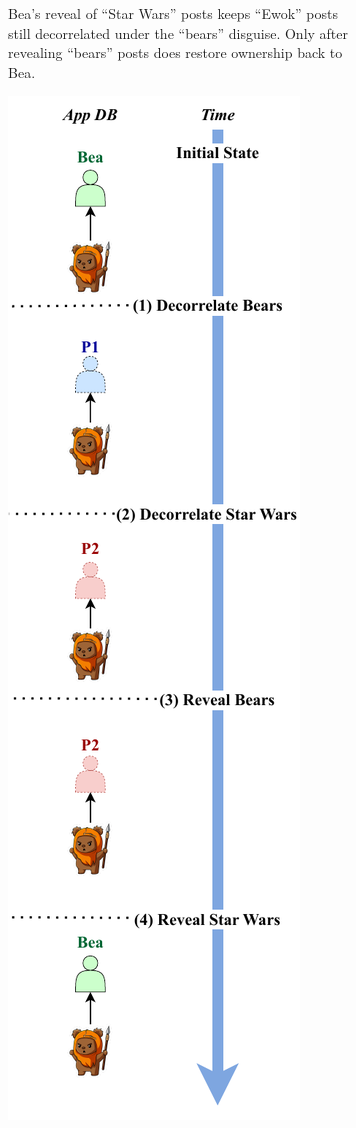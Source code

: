 \begin{figure}
\begin{subfigure}[t]{.47\columnwidth}
  \caption{Bea's reveal of ``Star Wars'' posts keeps ``Ewok'' posts still
        decorrelated under the ``bears'' disguise. Only after revealing
        ``bears'' posts does \sys restore ownership back to Bea.}
    \label{f:composition-hl-inorder}
    \end{subfigure}
    \hfill
\begin{subfigure}[t]{.47\columnwidth}
    \centering
    \includegraphics[width=.75\textwidth]{figs/composition-hl-ooo}

\end{subfigure}
\end{figure}
